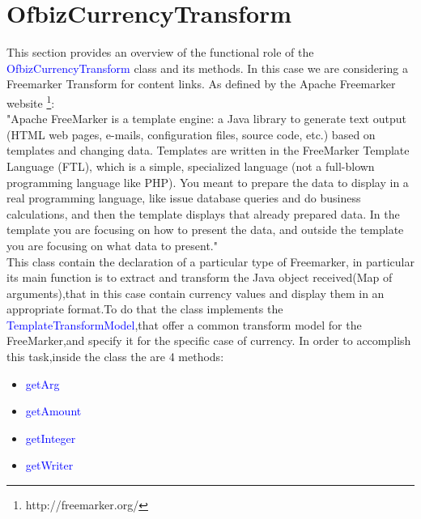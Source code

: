 \section{OfbizCurrencyTransform}
This section provides an overview of the functional role of the \textcolor{blue}{OfbizCurrencyTransform} class and its methods.
In this case we are considering a Freemarker Transform for content links.
As defined by the Apache Freemarker website \footnote{http://freemarker.org/}: \\
"Apache FreeMarker is a template engine: a Java library to generate text output (HTML web pages, e-mails, configuration files, source code, etc.) based on templates and changing data. Templates are written in the FreeMarker Template Language (FTL), which is a simple, specialized language (not a full-blown programming language like PHP). You meant to prepare the data to display in a real programming language, like issue database queries and do business calculations, and then the template displays that already prepared data. In the template you are focusing on how to present the data, and outside the template you are focusing on what data to present." \\
This class contain the declaration of a particular type of Freemarker, in particular its main function is to extract and transform the Java object received(Map of arguments),that in this case contain currency values and display them in an appropriate format.To do that the class implements the \textcolor{blue}{TemplateTransformModel},that offer a common transform model for the FreeMarker,and specify it for the specific case of currency.
In order to accomplish this task,inside the class the are 4 methods:
\begin{itemize}
\item \textcolor{blue}{getArg}
\item \textcolor{blue}{getAmount}
\item \textcolor{blue}{getInteger}
\item \textcolor{blue}{getWriter}
\end{itemize}

